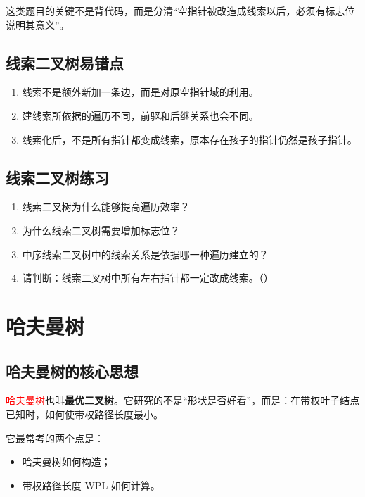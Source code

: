 \documentclass{../../note}
\begin{document}
这类题目的关键不是背代码，而是分清“空指针被改造成线索以后，必须有标志位说明其意义”。

\subsection{线索二叉树易错点}

\begin{enumerate}
  \item 线索不是额外新加一条边，而是对原空指针域的利用。
  \item 建线索所依据的遍历不同，前驱和后继关系也会不同。
  \item 线索化后，不是所有指针都变成线索，原本存在孩子的指针仍然是孩子指针。
\end{enumerate}

\subsection{线索二叉树练习}

\begin{enumerate}
  \item 线索二叉树为什么能够提高遍历效率？
  \item 为什么线索二叉树需要增加标志位？
  \item 中序线索二叉树中的线索关系是依据哪一种遍历建立的？
  \item 请判断：线索二叉树中所有左右指针都一定改成线索。（\hspace{1cm}）
\end{enumerate}

\section{哈夫曼树}

\subsection{哈夫曼树的核心思想}

\textcolor{red}{哈夫曼树}也叫\textbf{最优二叉树}。它研究的不是“形状是否好看”，而是：在带权叶子结点已知时，如何使带权路径长度最小。

它最常考的两个点是：

\begin{itemize}
  \item 哈夫曼树如何构造；
  \item 带权路径长度 WPL 如何计算。
\end{itemize}
\end{document}
